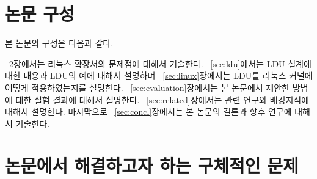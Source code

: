 

\newpage
\section{논문 구성} \label{sec:intro}
본 논문의 구성은 다음과 같다.

~\ref{sec:bg}장에서는 리눅스 확장서의 문제점에 대해서 기술한다. 
~\ref{sec:ldu}에서는 LDU 설계에 대한 내용과 LDU의 예에 대해서 설명하며 
~\ref{sec:linux}장에서는 LDU를 리눅스 커널에 어떻게 적용하였는지를 설명한다.
~\ref{sec:evaluation}장에서는 본 논문에서 제안한 방법에 대한 실험 결과에 대해서 설명한다. 
~\ref{sec:related}장에서는 관련 연구와 배경지식에 대해서 설명한다.
마지막으로 ~\ref{sec:concl}장에서는 본 논문의 결론과 향후 연구에 대해서 기술한다. 

\newpage
\section{논문에서 해결하고자 하는 구체적인 문제}\label{sec:bg}




